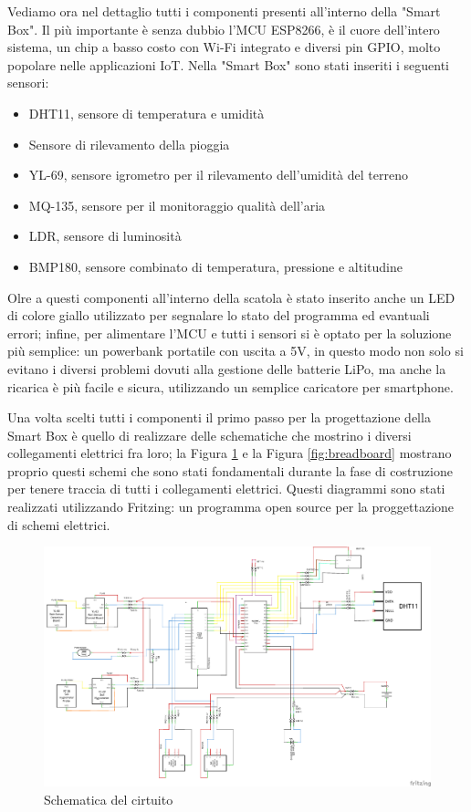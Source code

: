 \documentclass[a4paper, 12pt]{report}
\begin{document}
Vediamo ora nel dettaglio tutti i componenti presenti all'interno della "Smart Box". Il più importante è senza dubbio l'MCU ESP8266, è il cuore dell'intero sistema, un chip a basso costo con Wi-Fi integrato e diversi pin
GPIO, molto popolare nelle applicazioni IoT.
Nella "Smart Box" sono stati inseriti i seguenti sensori:

\begin{itemize}
\item DHT11, sensore di temperatura e umidità
\item Sensore di rilevamento della pioggia 
\item YL-69, sensore igrometro per il rilevamento dell'umidità del terreno
\item MQ-135, sensore per il monitoraggio qualità dell'aria
\item LDR, sensore di luminosità 
\item BMP180, sensore combinato di temperatura, pressione e altitudine
\end{itemize}

Olre a questi componenti all'interno della scatola è stato inserito anche un LED di colore giallo utilizzato per segnalare lo stato del programma ed evantuali errori; infine, per alimentare l'MCU e tutti i sensori si 
è optato per la soluzione più semplice: un powerbank portatile con uscita a 5V, in questo modo non solo si evitano i diversi problemi dovuti alla gestione delle batterie LiPo, ma anche la ricarica è più 
facile e sicura, utilizzando un semplice caricatore per smartphone.

Una volta scelti tutti i componenti il primo passo per la progettazione della Smart Box è quello di realizzare delle schematiche che mostrino i diversi collegamenti elettrici fra loro; la Figura \ref{fig:schematics} 
e la Figura \ref{fig:breadboard} mostrano proprio questi schemi che sono stati fondamentali durante la fase di costruzione per tenere traccia di tutti i collegamenti elettrici. Questi diagrammi sono stati realizzati 
utilizzando Fritzing: un programma open source per la proggettazione di schemi elettrici.

\begin{figure}[htbp]
\centering
\includegraphics[scale=0.4]{hardware/iot_project_schem.png}
\caption{Schematica del cirtuito}
\label{fig:schematics}
\end{figure}
\end{document}
